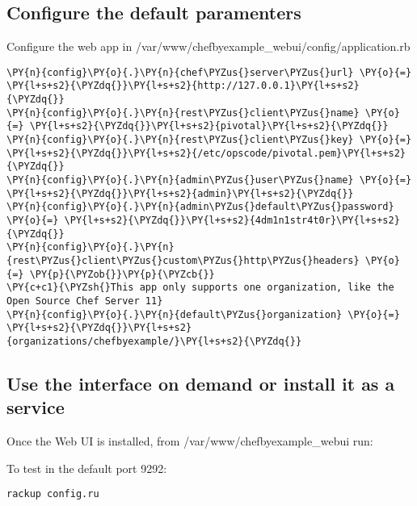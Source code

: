 \subsection{Configure the default paramenters}

Configure the web app in /var/www/chefbyexample\_webui/config/application.rb

\begin{codelisting}
\label{code:}
\codecaption{}
\begin{Verbatim}[fontsize=\relsize{-2.5},fontseries=b,commandchars=\\\{\}]
\PY{n}{config}\PY{o}{.}\PY{n}{chef\PYZus{}server\PYZus{}url} \PY{o}{=} \PY{l+s+s2}{\PYZdq{}}\PY{l+s+s2}{http://127.0.0.1}\PY{l+s+s2}{\PYZdq{}}
\PY{n}{config}\PY{o}{.}\PY{n}{rest\PYZus{}client\PYZus{}name} \PY{o}{=} \PY{l+s+s2}{\PYZdq{}}\PY{l+s+s2}{pivotal}\PY{l+s+s2}{\PYZdq{}}
\PY{n}{config}\PY{o}{.}\PY{n}{rest\PYZus{}client\PYZus{}key} \PY{o}{=} \PY{l+s+s2}{\PYZdq{}}\PY{l+s+s2}{/etc/opscode/pivotal.pem}\PY{l+s+s2}{\PYZdq{}}
\PY{n}{config}\PY{o}{.}\PY{n}{admin\PYZus{}user\PYZus{}name} \PY{o}{=}  \PY{l+s+s2}{\PYZdq{}}\PY{l+s+s2}{admin}\PY{l+s+s2}{\PYZdq{}}
\PY{n}{config}\PY{o}{.}\PY{n}{admin\PYZus{}default\PYZus{}password} \PY{o}{=} \PY{l+s+s2}{\PYZdq{}}\PY{l+s+s2}{4dm1n1str4t0r}\PY{l+s+s2}{\PYZdq{}}
\PY{n}{config}\PY{o}{.}\PY{n}{rest\PYZus{}client\PYZus{}custom\PYZus{}http\PYZus{}headers} \PY{o}{=} \PY{p}{\PYZob{}}\PY{p}{\PYZcb{}}
\PY{c+c1}{\PYZsh{}This app only supports one organization, like the Open Source Chef Server 11}
\PY{n}{config}\PY{o}{.}\PY{n}{default\PYZus{}organization} \PY{o}{=} \PY{l+s+s2}{\PYZdq{}}\PY{l+s+s2}{organizations/chefbyexample/}\PY{l+s+s2}{\PYZdq{}}
\end{Verbatim}
\end{codelisting}

\subsection{Use the interface on demand or install it as a service}

Once the Web UI is installed, from /var/www/chefbyexample\_webui run:

To test in the default port 9292:
\begin{codelisting}
\label{code:}
\codecaption{}
\begin{Verbatim}[fontsize=\relsize{-2.5},fontseries=b,commandchars=\\\{\}]
rackup config.ru
\end{Verbatim}
\end{codelisting}

